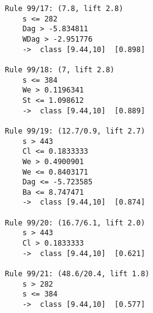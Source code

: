 \begin{tcolorbox}[title=Reglas de clasificación para identificar intervalos de notas.]
\begin{multicols}{3}
\begin{verbatim}
Rule 99/17: (7.8, lift 2.8)
	s <= 282
	Dag > -5.834811
	WDag > -2.951776
	->  class [9.44,10]  [0.898]

Rule 99/18: (7, lift 2.8)
	s <= 384
	We > 0.1196341
	St <= 1.098612
	->  class [9.44,10]  [0.889]

Rule 99/19: (12.7/0.9, lift 2.7)
	s > 443
	Cl <= 0.1833333
	We > 0.4900901
	We <= 0.8403171
	Dag <= -5.723585
	Ba <= 8.747471
	->  class [9.44,10]  [0.874]

Rule 99/20: (16.7/6.1, lift 2.0)
	s > 443
	Cl > 0.1833333
	->  class [9.44,10]  [0.621]

Rule 99/21: (48.6/20.4, lift 1.8)
	s > 282
	s <= 384
	->  class [9.44,10]  [0.577]
    \end{verbatim}
  \end{multicols}
\label{rules8}
\end{tcolorbox}